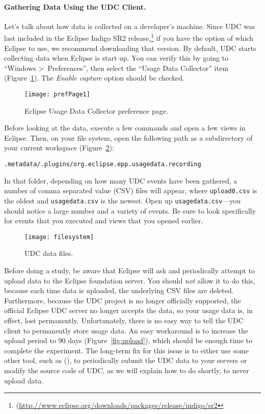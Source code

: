 \paragraph{Gathering Data Using the UDC Client.}

Let's talk about how data is collected on a developer's machine.
Since UDC was last included in the Eclipse Indigo SR2
release,\footnote{(\url{http://www.eclipse.org/downloads/packages/release/indigo/sr2}}
if you have the option of which Eclipse to use, we recommend downloading
that version.
By default, UDC starts collecting data when Eclipse is start up.
You can verify this by going to ``Windows \textgreater~Preferences'', then
select the ``Usage Data Collector'' item (Figure~\ref{fig:prefPage1}).
The \textit{Enable capture} option should be checked.

\begin{figure}
  \centering
  \texttt{[image: prefPage1]}
  \caption{Eclipse Usage Data Collector preference page.}\label{fig:prefPage1}
\end{figure}

Before looking at the data, execute a few commands and open a few views
in Eclipse.
Then, on your file system, open the following path as a subdirectory
of your current workspace (Figure~\ref{fig:filesystem}):

\vspace{4mm}
\texttt{.metadata/.plugins/org.eclipse.epp.usagedata.recording}
\vspace{4mm}

\noindent
In that folder, depending on how many UDC events have been gathered,
a number of comma separated value (CSV) files will appear, where \texttt{upload0.csv} is the oldest
and \texttt{usagedata.csv} is the newest.
Open up \texttt{usagedata.csv}---you should notice a large number and a variety of events.
Be sure to look specifically for events that you executed and views that you opened earlier.

\begin{figure}
  \centering
  \texttt{[image: filesystem]}
  \caption{UDC data files.}\label{fig:filesystem}
\end{figure}

Before doing a study, be aware that Eclipse will ask and periodically attempt to upload
data to the Eclipse foundation server.
You should \emph{not} allow it to do this, because each time data is uploaded, the underlying
CSV files are deleted.
Furthermore, because the UDC project is no longer officially supported, the official Eclipse
UDC server no longer accepts the data, so your usage data is, in effect, lost permanently.
Unfortunately, there is no easy way to tell the UDC client to permanently store
usage data.
An easy workaround is to increase the upload period to 90 days (Figure~\ref{fig:upload}),
which should be enough time to complete the experiment.
The long-term fix for this issue is to either use some other tool, such as
\CodingSpectator{} (), to periodically submit the UDC
data to your servers or modify the source code of UDC, as we will explain how to
do shortly, to never upload data.


